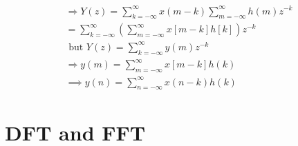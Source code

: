 \documentclass[journal,12pt,twocolumn]{IEEEtran}
\renewcommand\thesection{\arabic{section}}
\begin{document}
\begin{enumerate}[label=\thesection.\arabic*]
			\begin{align}
				\Rightarrow Y(z)=\sum_{k=-\infty}^{\infty} x(m-k) \sum_{m=-\infty}^{\infty} h(m) z^{-k} \\
				=\sum_{k=-\infty}^{\infty}\left(\sum_{m=-\infty}^{\infty} x[m-k] h[k]\right) z^{-k} \\
				\text { but } Y(z)=\sum_{k=-\infty}^{\infty} y(m) z^{-k} \\
				\Rightarrow y(m)=\sum_{m=-\infty}^{\infty} x[m-k] h(k) \\
				\implies y(n)=\sum_{n=-\infty}^{\infty} x(n-k) h(k) 
			\end{align}
			
		\end{enumerate}
		
		\section{DFT and FFT}
\end{document}
